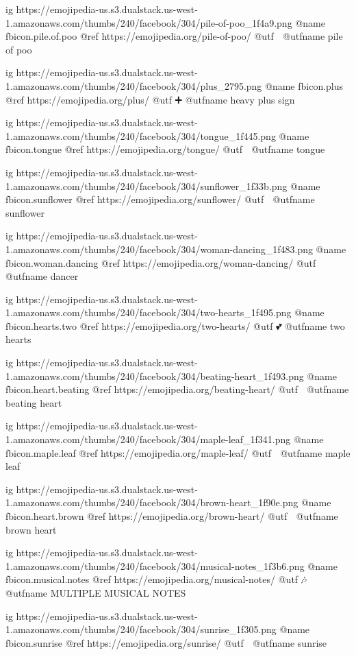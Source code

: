   ig https://emojipedia-us.s3.dualstack.us-west-1.amazonaws.com/thumbs/240/facebook/304/pile-of-poo_1f4a9.png
  @name fbicon.pile.of.poo
  @ref https://emojipedia.org/pile-of-poo/
  @utf 💩
  @utfname pile of poo

  ig https://emojipedia-us.s3.dualstack.us-west-1.amazonaws.com/thumbs/240/facebook/304/plus_2795.png
  @name fbicon.plus
  @ref https://emojipedia.org/plus/
  @utf ➕
  @utfname heavy plus sign

  ig https://emojipedia-us.s3.dualstack.us-west-1.amazonaws.com/thumbs/240/facebook/304/tongue_1f445.png
  @name fbicon.tongue
  @ref https://emojipedia.org/tongue/
  @utf 👅
  @utfname tongue

  ig https://emojipedia-us.s3.dualstack.us-west-1.amazonaws.com/thumbs/240/facebook/304/sunflower_1f33b.png
  @name fbicon.sunflower
  @ref https://emojipedia.org/sunflower/
  @utf 🌻
  @utfname sunflower

  ig https://emojipedia-us.s3.dualstack.us-west-1.amazonaws.com/thumbs/240/facebook/304/woman-dancing_1f483.png
  @name fbicon.woman.dancing
  @ref https://emojipedia.org/woman-dancing/
  @utf 💃
  @utfname dancer

  ig https://emojipedia-us.s3.dualstack.us-west-1.amazonaws.com/thumbs/240/facebook/304/two-hearts_1f495.png
  @name fbicon.hearts.two
  @ref https://emojipedia.org/two-hearts/
  @utf 💕
  @utfname two hearts

  ig https://emojipedia-us.s3.dualstack.us-west-1.amazonaws.com/thumbs/240/facebook/304/beating-heart_1f493.png
  @name fbicon.heart.beating
  @ref https://emojipedia.org/beating-heart/
  @utf 💓
  @utfname beating heart

  ig https://emojipedia-us.s3.dualstack.us-west-1.amazonaws.com/thumbs/240/facebook/304/maple-leaf_1f341.png
  @name fbicon.maple.leaf
  @ref https://emojipedia.org/maple-leaf/
  @utf 🍁
  @utfname maple leaf

  ig https://emojipedia-us.s3.dualstack.us-west-1.amazonaws.com/thumbs/240/facebook/304/brown-heart_1f90e.png
  @name fbicon.heart.brown
  @ref https://emojipedia.org/brown-heart/
  @utf 🤎
  @utfname brown heart

  ig https://emojipedia-us.s3.dualstack.us-west-1.amazonaws.com/thumbs/240/facebook/304/musical-notes_1f3b6.png
  @name fbicon.musical.notes
  @ref https://emojipedia.org/musical-notes/
  @utf 🎶
  @utfname MULTIPLE MUSICAL NOTES

  ig https://emojipedia-us.s3.dualstack.us-west-1.amazonaws.com/thumbs/240/facebook/304/sunrise_1f305.png
  @name fbicon.sunrise
  @ref https://emojipedia.org/sunrise/
  @utf 🌅
  @utfname sunrise

